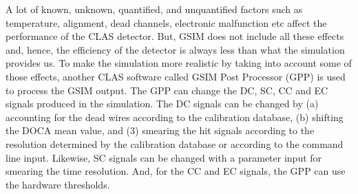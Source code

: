 
\hspace{0.5cm}

A lot of known, unknown, quantified, and unquantified factors such as temperature, alignment, dead channels, electronic malfunction etc affect the performance of the CLAS detector. But, GSIM does not include all these effects and, hence, the efficiency of the detector is always less than what the simulation provides us. To make the simulation more realistic by taking into account some of those effects, another CLAS software called GSIM Post Processor (GPP) is used to process the GSIM output. The GPP can change the DC, SC, CC and EC signals produced in the simulation. The DC signals can be changed by (a) accounting for the dead wires according to the calibration database, (b) shifting the DOCA mean value, and (3) smearing the hit signals according to the resolution determined by the calibration database or according to the command line input. Likewise, SC signals can be changed with a parameter input for smearing the time resolution. And, for the CC and EC signals, the GPP can use the hardware thresholds\cite{jxZhang_th}.

